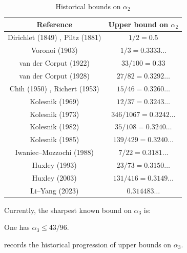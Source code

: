 \begin{table}[ht]
    \def\arraystretch{1.2}
    \centering
    \caption{Historical bounds on $\alpha_2$}
    \begin{tabular}{|c|c|}
    \hline
    Reference & Upper bound on $\alpha_2$\\
    \hline
    Dirichlet (1849) \cite{dirichlet_bestimmung_1849}, Piltz (1881) \cite{piltz_gesetz_1881} & $1/2 = 0.5$\\
    \hline
    Voronoi (1903) \cite{voronoi_sur_1903} & $1/3 = 0.3333\ldots$\\
    \hline
    van der Corput (1922) \cite{van_der_corput_verscharfung_1922} & $33/100 = 0.33$\\
    \hline
    van der Corput (1928) \cite{van_der_corput_zum_1928} & $27/82 = 0.3292\ldots$\\
    \hline 
    Chih (1950) \cite{chih_on_1950}, Richert (1953) \cite{richert_verschrfung_1953} & $15/46 = 0.3260\ldots$\\
    \hline 
    Kolesnik (1969) \cite{kolesnik_improvement_1969} & $12/37 = 0.3243\ldots$\\
    \hline 
    Kolesnik (1973) \cite{kolesnik_1973} & $346/1067 = 0.3242\ldots$\\
    \hline 
    Kolesnik (1982) \cite{kolesnik_order_1982} & $35/108 = 0.3240\ldots$\\
    \hline 
    Kolesnik (1985) \cite[p. 118]{kolesnik_1985} & $139/429 = 0.3240\ldots$\\
    \hline
    Iwaniec--Mozzochi (1988) \cite{iwaniec_divisor_1988} & $7/22 = 0.3181\ldots$\\
    \hline
    Huxley (1993) \cite{huxley_exponential_1993} & $23/73 = 0.3150\ldots$\\
    \hline
    Huxley (2003) \cite{huxley_exponential_2003} & $131/416 = 0.3149\ldots$\\
    \hline 
    Li--Yang (2023) \cite{li_yang_gauss_2024} & $0.314483\ldots$\\
    \hline 
    \end{tabular}
\label{div-alpha2-table}
\end{table}

Currently, the sharpest known bound on $\alpha_3$ is:

\begin{theorem}\label{divisor-kolesnik}\cite{kolesnik} One has $\alpha_3 \leq 43/96$.
\end{theorem}

 records the historical progression of upper bounds on $\alpha_3$.

